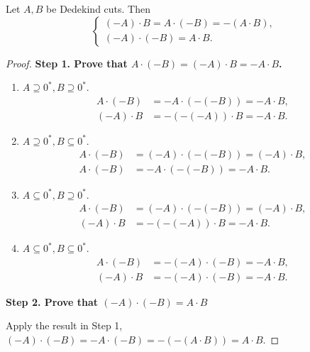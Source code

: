 \begin{theorem}\label{theorem:chapter1:multiplication-and-negation}
    Let $A, B$ be Dedekind cuts. Then
    \[
        \begin{cases}
            (-A)\cdot B = A\cdot (-B) = -(A\cdot B), \\
            (-A)\cdot (-B) = A\cdot B.
        \end{cases}
    \]
\end{theorem}

\begin{proof}
    \noindent\textbf{Step 1. Prove that $A\cdot (-B) = (-A)\cdot B = -A\cdot B$.}

    \begin{enumerate}[label={\textbf{Case \arabic*.}},itemsep=0pt,itemindent=0.5cm]
        \item $A\supseteq {0}^{*}, B\supseteq {0}^{*}$.
              \begin{align*}
                  A\cdot (-B) & = -A\cdot (-(-B)) = -A\cdot B, \\
                  (-A)\cdot B & = -(-(-A))\cdot B = -A\cdot B.
              \end{align*}
        \item $A\supseteq {0}^{*}, B\subseteq {0}^{*}$.
              \begin{align*}
                  A\cdot (-B) & = (-A)\cdot (-(-B)) = (-A)\cdot B, \\
                  A\cdot (-B) & = -A\cdot (-(-B)) = -A\cdot B.
              \end{align*}
        \item $A\subseteq {0}^{*}, B\supseteq {0}^{*}$.
              \begin{align*}
                  A\cdot (-B) & = (-A)\cdot (-(-B)) = (-A)\cdot B, \\
                  (-A)\cdot B & = -(-(-A))\cdot B = -A\cdot B.
              \end{align*}
        \item $A\subseteq {0}^{*}, B\subseteq {0}^{*}$.
              \begin{align*}
                  A\cdot (-B) & = -(-A)\cdot (-B) = -A\cdot B, \\
                  (-A)\cdot B & = -(-A)\cdot (-B) = -A\cdot B.
              \end{align*}
    \end{enumerate}

    \noindent\textbf{Step 2. Prove that $(-A)\cdot (-B) = A\cdot B$}

    \noindent Apply the result in Step 1, $(-A)\cdot (-B) = -A\cdot (-B) = -(-(A\cdot B)) = A\cdot B$.
\end{proof}

